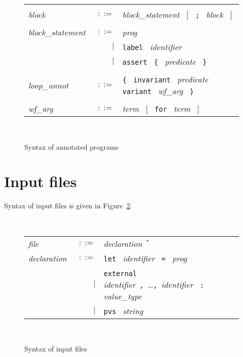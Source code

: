\documentclass[a4paper,12pt]{report}
\newcommand{\te}[1]{\texttt{#1}~}
\newcommand{\nt}[1]{\textsl{#1}~}
\begin{document}
\begin{figure}[htbp]
\begin{center}
\begin{tabular}{lrl}
      & & \\[0.1em]

  \nt{block} 
    & $::=$ & \nt{block\_statement}  $[$~ \te{;} \nt{block} $]$ \\

      & & \\[0.1em]

  \nt{block\_statement}
    & $::=$ & \nt{prog} \\
      & $|$ & \te{label}  \nt{identifier} \\
      & $|$ & \te{assert}  \te{\{}  \nt{predicate}  \te{\}} \\

      & & \\[0.1em]

  \nt{loop\_annot}
    & $::=$ & \te{\{}  \te{invariant}  \nt{predicate} 
              \te{variant}  \nt{wf\_arg}  \te{\}} \\
      & & \\[0.1em]

  \nt{wf\_arg} 
    & $::=$ & \nt{term}  $[$~ \te{for} \nt{term} $]$ \\

\end{tabular}\\
\hrulefill
\caption{Syntax of annotated programs}
\label{fig:caml}
\end{center}
\end{figure}

\section{Input files}

Syntax of input files is given in Figure~\ref{fig:input}.

\begin{figure}[htbp]
\begin{center}
\hrulefill\\
\begin{tabular}{lrl}
  \nt{file}
    & $::=$ & \nt{declaration}$^*$
  \\[0.1em]

  \nt{declaration}
    & $::=$ & \te{let} \nt{identifier} \te{=} \nt{prog} \\
      & $|$ & \te{external} \nt{identifier}\te{,}\dots\te{,}\nt{identifier}
              \te{:} \nt{value\_type} \\
      & $|$ & \te{pvs} \nt{string}
\end{tabular}\\
\hrulefill
\caption{Syntax of input files}
\label{fig:input}
\end{center}            
\end{figure}
\end{document}
